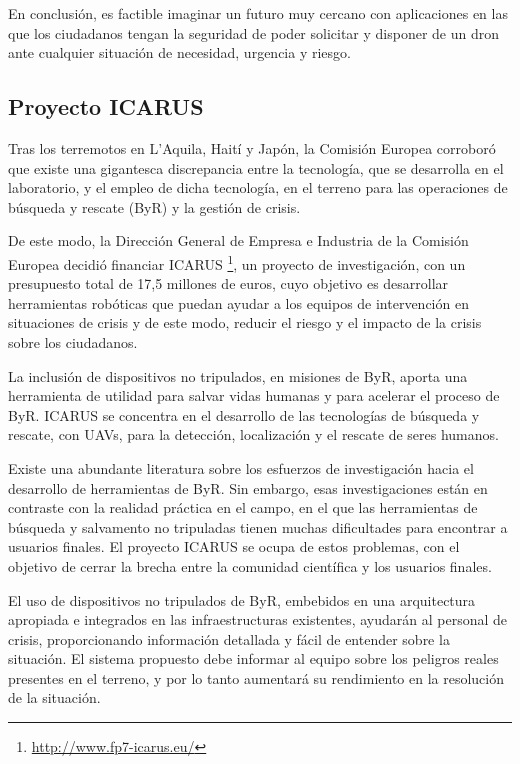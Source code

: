 En conclusión, es factible imaginar un futuro muy cercano con aplicaciones en las que los ciudadanos tengan la seguridad de poder solicitar y disponer de un dron ante cualquier situación de necesidad, urgencia y riesgo.

\subsection{Proyecto ICARUS}
\label{sec:icarus}

Tras los terremotos en L'Aquila, Haití y Japón, la Comisión Europea corroboró que existe una gigantesca discrepancia entre la tecnología, que se desarrolla en el laboratorio, y el empleo de dicha tecnología, en el terreno para las operaciones de búsqueda y rescate (\acs{ByR}) y la gestión de crisis.

De este modo, la Dirección General de Empresa e Industria de la Comisión Europea decidió financiar ICARUS \footnote{\url{http://www.fp7-icarus.eu/}}, un proyecto de investigación, con un presupuesto total de 17,5 millones de euros, cuyo objetivo es desarrollar herramientas robóticas que puedan ayudar a los equipos de intervención en situaciones de crisis y de este modo, reducir el riesgo y el impacto de la crisis sobre los ciudadanos.

La inclusión de dispositivos no tripulados, en misiones de \acs{ByR}, aporta una herramienta de utilidad para salvar vidas humanas y para acelerar el proceso de \acs{ByR}. ICARUS se concentra en el desarrollo de las tecnologías de búsqueda y rescate, con \acs{UAV}s, para la detección, localización y el rescate de seres humanos.

Existe una abundante literatura sobre los esfuerzos de investigación hacia el desarrollo de herramientas de \acs{ByR}. Sin embargo, esas investigaciones están en contraste con la realidad práctica en el campo, en el que las herramientas de búsqueda y salvamento no tripuladas tienen muchas dificultades para encontrar a usuarios finales. El proyecto ICARUS se ocupa de estos problemas, con el objetivo de cerrar la brecha entre la comunidad científica y los usuarios finales.

El uso de dispositivos no tripulados de \acs{ByR}, embebidos en una arquitectura apropiada e integrados en las infraestructuras existentes, ayudarán al personal de crisis, proporcionando información detallada y fácil de entender sobre la situación. El sistema propuesto debe informar al equipo sobre los peligros reales presentes en el terreno, y por lo tanto aumentará su rendimiento en la resolución de la situación.

